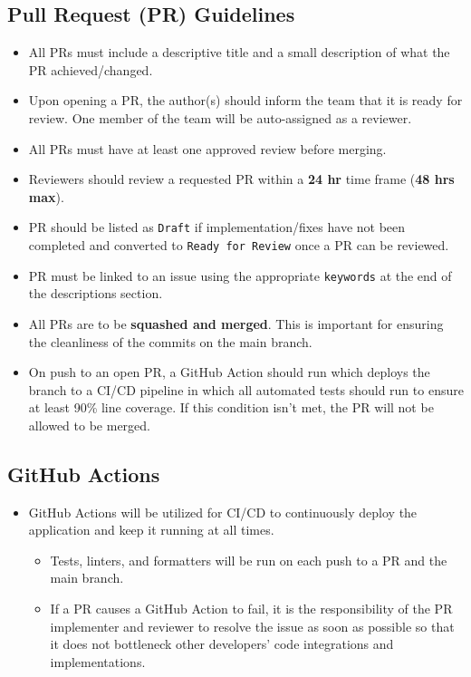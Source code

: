 \documentclass{article}
\begin{document}
\newpage

\subsection{Pull Request (PR) Guidelines}
\begin{itemize}
    \item All PRs must include a descriptive title and a small description of what the PR achieved/changed.
    \item Upon opening a PR, the author(s) should inform the team that it is ready for review. One member of the team will be auto-assigned as a reviewer.
    \item All PRs must have at least one approved review before merging.
\end{itemize}

\begin{itemize}
    \item Reviewers should review a requested PR within a \textbf{24 hr} time frame (\textbf{48 hrs max}).
    \item PR should be listed as \texttt{Draft} if implementation/fixes have not been completed and converted to \texttt{Ready for Review} once a PR can be reviewed.
    \item PR must be linked to an issue using the appropriate \texttt{keywords} at the end of the descriptions section.
    \item All PRs are to be \textbf{squashed and merged}. This is important for ensuring the cleanliness of the commits on the main branch.
    \item On push to an open PR, a GitHub Action should run which deploys the branch to a CI/CD pipeline in which all automated tests should run to ensure at least 90\% line coverage. If this condition isn’t met, the PR will not be allowed to be merged.
\end{itemize}

\subsection{GitHub Actions}
\begin{itemize}
    \item GitHub Actions will be utilized for CI/CD to continuously deploy the application and keep it running at all times.
    \begin{itemize}
        \item Tests, linters, and formatters will be run on each push to a PR and the main branch.
        \item If a PR causes a GitHub Action to fail, it is the responsibility of the PR implementer and reviewer to resolve the issue as soon as possible so that it does not bottleneck other developers’ code integrations and implementations.
    \end{itemize}
\end{itemize}
\end{document}
